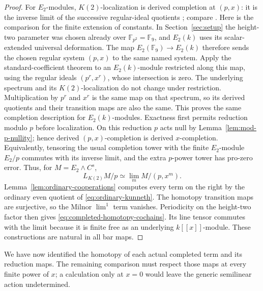 \begin{proof}
For $E_2$-modules, $K(2)$-localization is derived completion at
$(p,x)$: it is the inverse limit of the successive regular-ideal
quotients \cite[Proposition~2.2 and Theorem~2.3]{Hovey04}; compare
\cite[Proposition~7.10(e)]{HS99}.
Here is the comparison for the finite extension of constants. In
Section~\ref{sec:setup} the height-two parameter was chosen already over
$\mathbb F_{p^2}=\mathbb F_9$, and $E_2(k)$ uses its scalar-extended
universal deformation. The map
$E_2(\mathbb F_9)\to E_2(k)$ therefore sends the chosen regular system
$(p,x)$ to the same named system. Apply the standard-coefficient theorem
to an $E_2(k)$-module restricted along this map, using the regular ideals
$(p^r,x^r)$, whose intersection is zero. The underlying spectrum and
its $K(2)$-localization do not change under restriction. Multiplication
by $p^r$ and $x^r$ is the same map on that spectrum, so its derived
quotients and their transition maps are also the same. This proves the
same completion description for $E_2(k)$-modules.
Exactness first permits reduction
modulo $p$ before localization.  On this reduction $p$ acts null by
Lemma~\ref{lem:mod-p-nullity}; hence derived $(p,x)$-completion is
derived $x$-completion.  Equivalently, tensoring the usual completion
tower with the finite $E_2$-module $E_2/p$ commutes with its inverse
limit, and the extra $p$-power tower has pro-zero error.  Thus, for
$M=E_2\wedge C^s$,
\[
  L_{K(2)}M/p\simeq\lim_m M/(p,x^m).
\]
Lemma~\ref{lem:ordinary-cooperations} computes every term on the
right by the ordinary even quotient of \eqref{eq:ordinary-kunneth}.
The homotopy transition maps are surjective, so the Milnor
$\lim^1$ term vanishes.  Periodicity on the height-two factor then
gives \eqref{eq:completed-homotopy-cochains}.  Its line tensor
commutes with the limit because it is finite free as an underlying
$k[[x]]$-module.  These constructions are natural in all bar maps.
\end{proof}


We have now identified the homotopy of each actual completed term and its
reduction maps. The remaining comparison must respect those maps at every
finite power of \(x\); a calculation only at \(x=0\) would leave the
generic semilinear action undetermined.
